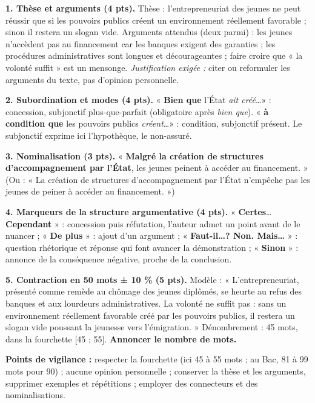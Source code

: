 \documentclass[11pt]{article}
\begin{document}
\begin{corrige}
\textbf{1. Thèse et arguments (4 pts).} Thèse : l'entrepreneuriat des jeunes ne peut réussir que si les pouvoirs publics créent un environnement réellement favorable ; sinon il restera un slogan vide. Arguments attendus (deux parmi) : les jeunes n'accèdent pas au financement car les banques exigent des garanties ; les procédures administratives sont longues et décourageantes ; faire croire que « la volonté suffit » est un mensonge. \emph{Justification exigée :} citer ou reformuler les arguments du texte, pas d'opinion personnelle.

\textbf{2. Subordination et modes (4 pts).} « \textbf{Bien que} l'État \emph{ait créé}\ldots » : concession, subjonctif plus-que-parfait (obligatoire après \emph{bien que}). « \textbf{à condition que} les pouvoirs publics \emph{créent}\ldots » : condition, subjonctif présent. Le subjonctif exprime ici l'hypothèque, le non-assuré.

\textbf{3. Nominalisation (3 pts).} « \textbf{Malgré la création de structures d'accompagnement par l'État}, les jeunes peinent à accéder au financement. » (Ou : « La création de structures d'accompagnement par l'État n'empêche pas les jeunes de peiner à accéder au financement. »)

\textbf{4. Marqueurs de la structure argumentative (4 pts).} « \textbf{Certes}\ldots \textbf{Cependant} » : concession puis réfutation, l'auteur admet un point avant de le nuancer ; « \textbf{De plus} » : ajout d'un argument ; « \textbf{Faut-il\ldots ? Non. Mais\ldots} » : question rhétorique et réponse qui font avancer la démonstration ; « \textbf{Sinon} » : annonce de la conséquence négative, proche de la conclusion.

\textbf{5. Contraction en 50 mots ± 10 \% (5 pts).} Modèle : « L'entrepreneuriat, présenté comme remède au chômage des jeunes diplômés, se heurte au refus des banques et aux lourdeurs administratives. La volonté ne suffit pas : sans un environnement réellement favorable créé par les pouvoirs publics, il restera un slogan vide poussant la jeunesse vers l'émigration. » Dénombrement : 45 mots, dans la fourchette [45 ; 55]. \textbf{Annoncer le nombre de mots.}

\textbf{Points de vigilance :} respecter la fourchette (ici 45 à 55 mots ; au Bac, 81 à 99 mots pour 90) ; aucune opinion personnelle ; conserver la thèse et les arguments, supprimer exemples et répétitions ; employer des connecteurs et des nominalisations.
\end{corrige}
\end{document}
